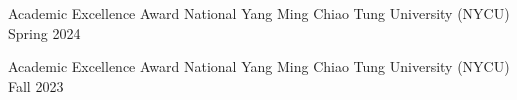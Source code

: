 
\begin{cvhonors}

  \cvhonor
    {Academic Excellence Award}
    {National Yang Ming Chiao Tung University (NYCU)}
    {Spring 2024}
    {}

  \cvhonor
    {Academic Excellence Award}
    {National Yang Ming Chiao Tung University (NYCU)}
    {Fall 2023}
    {}

\end{cvhonors}